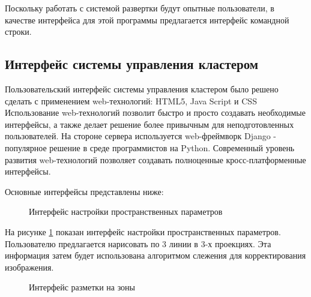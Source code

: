 Поскольку работать с системой развертки будут опытные пользователи, в качестве интерфейса для этой программы предлагается интерфейс командной строки.

\subsection{Интерфейс системы управления кластером }

Пользовательский интерфейс системы управления кластером было решено сделать с применением web-технологий: HTML5, Java Script и CSS Использование web-технологий позволит быстро и просто создавать необходимые интерфейсы, а также делает решение более привычным для неподготовленных пользователей. На стороне сервера используется web-фреймворк Django - популярное решение в среде программистов на Python. Современный уровень развития web-технологий позволяет создавать полноценные кросс-платформенные интерфейсы.

Основные интерфейсы представлены ниже:
\begin{figure}[h]
  \centering
  \caption{Интерфейс настройки пространственных параметров}
  \label{fig:fig01}
\end{figure}

На рисунке \ref{fig:fig01} показан интерфейс настройки пространственных параметров. Пользователю предлагается нарисовать по 3 линии в 3-х проекциях. Эта информация затем будет использована алгоритмом слежения для корректирования изображения.

\begin{figure}[h]
  \centering
  \caption{Интерфейс разметки на зоны}
  \label{fig:fig02}
\end{figure}

